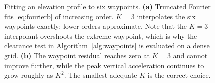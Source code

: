 \documentclass[11pt,a4paper]{article}
\begin{document}
\begin{figure}[htbp]
\begin{tikzpicture}
\end{tikzpicture}
\caption{Fitting an elevation profile to six waypoints. \textbf{(a)} Truncated
Fourier fits \eqref{eq:fourierb} of increasing order. $K=3$ interpolates the six
waypoints exactly; lower orders approximate. Note that the $K=3$ interpolant
overshoots the extreme waypoint, which is why the clearance test in
Algorithm~\ref{alg:waypoints} is evaluated on a dense grid.
\textbf{(b)} The waypoint residual reaches zero at $K=3$ and cannot improve
further, while the peak vertical acceleration continues to grow roughly as
$K^2$. The smallest adequate $K$ is the correct choice.}
\label{fig:wpfit}
\end{figure}

\begin{figure}[htbp]
\centering
{}
\end{figure}
\end{document}
